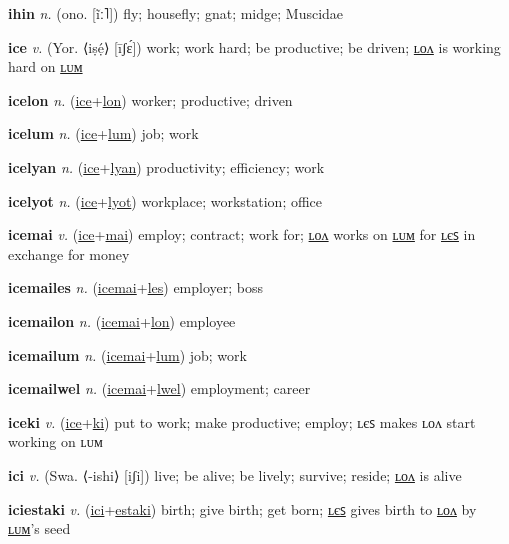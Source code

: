 \textbf{\hypertarget{ihin}{ihin}} \textit{n.} (ono. [ĩː˥])
fly; housefly; gnat; midge; Muscidae

\textbf{\hypertarget{ice}{ice}} \textit{v.} (Yor. ⟨iṣẹ́⟩ [īʃɛ́])
work; work hard; be productive; be driven; \hyperlink{icelon}{ʟᴏᴧ} is working hard on \hyperlink{icelum}{ʟᴜᴍ}

\textbf{\hypertarget{icelon}{icelon}} \textit{n.} (\hyperlink{ice}{ice}+\allowbreak \hyperlink{lon}{lon})
worker; productive; driven

\textbf{\hypertarget{icelum}{icelum}} \textit{n.} (\hyperlink{ice}{ice}+\allowbreak \hyperlink{lum}{lum})
job; work

\textbf{\hypertarget{icelyan}{icelyan}} \textit{n.} (\hyperlink{ice}{ice}+\allowbreak \hyperlink{lyan}{lyan})
productivity; efficiency; work

\textbf{\hypertarget{icelyot}{icelyot}} \textit{n.} (\hyperlink{ice}{ice}+\allowbreak \hyperlink{lyot}{lyot})
workplace; workstation; office

\textbf{\hypertarget{icemai}{icemai}} \textit{v.} (\hyperlink{ice}{ice}+\allowbreak \hyperlink{mai}{mai})
employ; contract; work for; \hyperlink{icemailon}{ʟᴏᴧ} works on \hyperlink{icemailum}{ʟᴜᴍ} for \hyperlink{icemailes}{ʟєꜱ} in exchange for money

\textbf{\hypertarget{icemailes}{icemailes}} \textit{n.} (\hyperlink{icemai}{icemai}+\allowbreak \hyperlink{les}{les})
employer; boss

\textbf{\hypertarget{icemailon}{icemailon}} \textit{n.} (\hyperlink{icemai}{icemai}+\allowbreak \hyperlink{lon}{lon})
employee

\textbf{\hypertarget{icemailum}{icemailum}} \textit{n.} (\hyperlink{icemai}{icemai}+\allowbreak \hyperlink{lum}{lum})
job; work

\textbf{\hypertarget{icemailwel}{icemailwel}} \textit{n.} (\hyperlink{icemai}{icemai}+\allowbreak \hyperlink{lwel}{lwel})
employment; career

\textbf{\hypertarget{iceki}{iceki}} \textit{v.} (\hyperlink{ice}{ice}+\allowbreak \hyperlink{ki}{ki})
put to work; make productive; employ; ʟєꜱ makes ʟᴏᴧ start working on ʟᴜᴍ

\textbf{\hypertarget{ici}{ici}} \textit{v.} (Swa. ⟨-ishi⟩ [iʃi])
live; be alive; be lively; survive; reside; \hyperlink{icilon}{ʟᴏᴧ} is alive

\textbf{\hypertarget{iciestaki}{iciestaki}} \textit{v.} (\hyperlink{ici}{ici}+\allowbreak \hyperlink{estaki}{estaki})
birth; give birth; get born; \hyperlink{iciestakiles}{ʟєꜱ} gives birth to \hyperlink{iciestakilon}{ʟᴏᴧ} by \hyperlink{iciestakilum}{ʟᴜᴍ}’s seed

